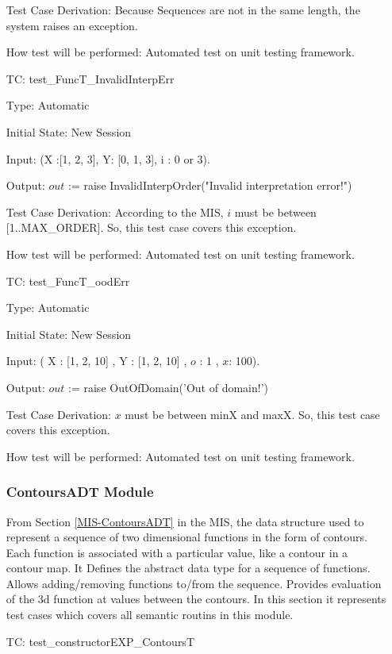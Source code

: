 \documentclass[12pt]{article}
\newcounter{utestnum} %
\begin{document}
\begin{enumerate}[label=TC\arabic*:,ref={\arabic*}]
Test Case Derivation: Because Sequences are not in the same length, the system raises an exception. 

How test will be performed: Automated test on unit testing framework.

\item [TC\refstepcounter{utestnum}\theutestnum: \label{FuncTssmErrTest}] 
test\_FuncT\_InvalidInterpErr

Type: Automatic

Initial State: New Session

Input: (X :[1, 2, 3], Y: [0, 1, 3], i : 0 or 3).

Output: $out$ := raise InvalidInterpOrder("Invalid interpretation error!")


Test Case Derivation: According to the MIS, $i$ must be between [1..\mbox{MAX\_ORDER}]. So, this test case covers this exception.

How test will be performed: Automated test on unit testing framework.

\item [TC\refstepcounter{utestnum}\theutestnum: \label{FuncToodErrTest}] 
test\_FuncT\_oodErr

Type: Automatic

Initial State: New Session

Input: ( X : [1, 2, 10] , Y : [1, 2, 10] , $o$ : 1 , $x$: 100).

Output: $out$ :=  raise OutOfDomain('Out of domain!')


Test Case Derivation:  $x$ must be between \mbox{minX} and \mbox{maxX}. So, this test case covers this exception.

How test will be performed: Automated test on unit testing framework.

\subsubsection{ContoursADT Module}	
From Section \ref{MIS-ContoursADT} in the MIS, the data structure used to represent a
sequence of two dimensional functions in the form of contours. Each function
is associated with a particular value, like a contour in a contour map.
It Defines the abstract data type for a sequence of functions.
Allows adding/removing functions to/from the sequence.  Provides evaluation of
the 3d function at values between the contours. In this section it represents test cases which covers all semantic routins in this module.

\item [TC\refstepcounter{utestnum}\theutestnum: \label{ConstructorEXPContoursTest}] 
test\_constructorEXP\_ContoursT


\end{enumerate}
\end{document}
